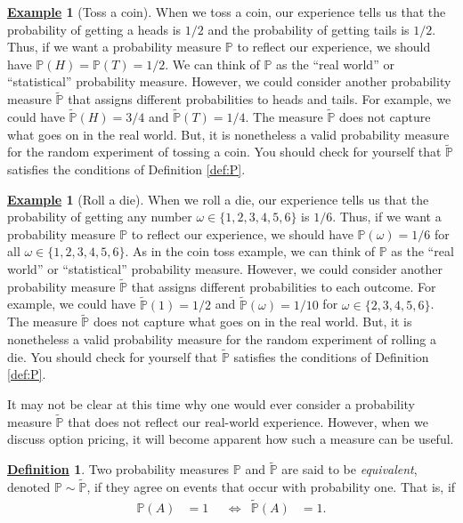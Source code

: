 \documentclass[12pt]{book}
\numberwithin{equation}{chapter}
\theoremstyle{plain}
\numberwithin{theorem}{section}
\theoremstyle{definition}
\newtheorem{definition}[theorem]{\underline{Definition}}
\newtheorem{example}[theorem]{\underline{Example}}
\numberwithin{exercise}{chapter}
\newcommand{\<}{\langle}
\renewcommand{\>}{\rangle}
\renewcommand{\(}{\left(}
\renewcommand{\)}{\right)}
\renewcommand{\[}{\left[}
\renewcommand{\]}{\right]}
\newcommand\Pb{\mathds{P}}
\newcommand\om{\omega}
\newcommand\Pbt{\widetilde{\Pb}}
\theoremstyle{definition}
\numberwithin{question}{section}
\begin{document}
\begin{example}[Toss a coin]
When we toss a coin, our experience tells us that the probability of getting a heads is $1/2$ and the probability of getting tails is $1/2$.  Thus, if we want a probability measure $\Pb$ to reflect our experience, we should have $\Pb(H) = \Pb(T) = 1/2$.  We can think of $\Pb$ as the ``real world'' or ``statistical'' probability measure.  However, we could consider another probability measure $\Pbt$ that assigns different probabilities to heads and tails.  For example, we could have $\Pbt(H) = 3/4$ and $\Pbt(T) = 1/4$.  The measure $\Pbt$ does not capture what goes on in the real world.  But, it is nonetheless a valid probability measure for the random experiment of tossing a coin.  You should check for yourself that $\Pbt$ satisfies the conditions of Definition \ref{def:P}.
\end{example}

\begin{example}[Roll a die]
When we roll a die, our experience tells us that the probability of getting any number $\om \in \{1,2,3,4,5,6\}$ is $1/6$.  Thus, if we want a probability measure $\Pb$ to reflect our experience, we should have $\Pb(\om) = 1/6$ for all $\om \in \{1,2,3,4,5,6\}$.  As in the coin toss example, we can think of $\Pb$ as the ``real world'' or ``statistical'' probability measure.  However, we could consider another probability measure $\Pbt$ that assigns different probabilities to each outcome.  For example, we could have $\Pbt(1) = 1/2$ and $\Pbt(\om) = 1/10$ for $\om \in \{ 2, 3, 4, 5, 6 \}$.  The measure $\Pbt$ does not capture what goes on in the real world.  But, it is nonetheless a valid probability measure for the random experiment of rolling a die.  You should check for yourself that $\Pbt$ satisfies the conditions of Definition \ref{def:P}.
\end{example}

\noindent
It may not be clear at this time why one would ever consider a probability measure $\Pbt$ that does not reflect our real-world experience.  However, when we discuss option pricing, it will become apparent how such a measure can be useful.

\begin{definition}
\label{def:equivalent}
Two probability measures $\Pb$ and $\Pbt$ are said to be \textit{equivalent}, denoted $\Pb \sim \Pbt$, if they agree on events that occur with probability one.  That is, if
\begin{align}
\Pb(A)
	&=	1  &
	&\Leftrightarrow&
\Pbt(A)
	&=	1 .
\end{align}
\end{definition}
\end{document}
